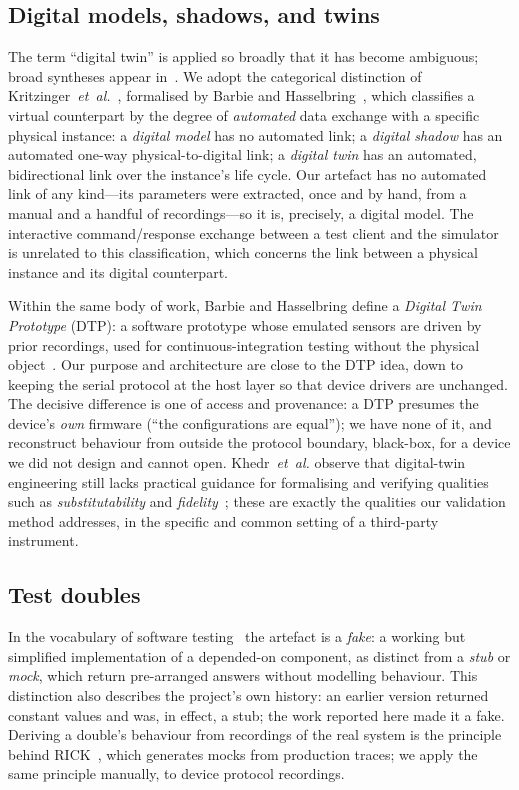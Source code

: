 \documentclass[conference]{IEEEtran}
\begin{document}
\subsection{Digital models, shadows, and twins}
The term ``digital twin'' is applied so broadly that it has become
ambiguous; broad syntheses appear in~\cite{tao2019dt,rasheed2020dt}. We adopt the categorical distinction of
Kritzinger~\emph{et~al.}~\cite{kritzinger2018dt}, formalised by Barbie
and Hasselbring~\cite{barbie2024dtp}, which classifies a virtual
counterpart by the degree of \emph{automated} data exchange with a
specific physical instance: a \emph{digital model} has no automated
link; a \emph{digital shadow} has an automated one-way
physical-to-digital link; a \emph{digital twin} has an automated,
bidirectional link over the instance's life cycle. Our artefact has no
automated link of any kind---its parameters were extracted, once and by
hand, from a manual and a handful of recordings---so it is, precisely, a
digital model. The interactive command/response exchange between a test
client and the simulator is unrelated to this classification, which
concerns the link between a physical instance and its digital
counterpart.

Within the same body of work, Barbie and Hasselbring define a
\emph{Digital Twin Prototype} (DTP): a software prototype whose emulated
sensors are driven by prior recordings, used for continuous-integration
testing without the physical
object~\cite{barbie2024dtp,barbie2023smartfarming}. Our purpose and
architecture are close to the DTP idea, down to keeping the serial
protocol at the host layer so that device drivers are unchanged. The
decisive difference is one of access and provenance: a DTP presumes the
device's \emph{own} firmware (``the configurations are equal''); we have
none of it, and reconstruct behaviour from outside the protocol
boundary, black-box, for a device we did not design and cannot open. Khedr~\emph{et~al.}
observe that digital-twin engineering still lacks practical guidance for
formalising and verifying qualities such as \emph{substitutability} and
\emph{fidelity}~\cite{khedr2026sos}; these are exactly the qualities our
validation method addresses, in the specific and common setting of a
third-party instrument.

\subsection{Test doubles}
In the vocabulary of software testing~\cite{meszaros2007xunit,%
fowler2007mocks} the artefact is a \emph{fake}: a working but simplified
implementation of a depended-on component, as distinct from a
\emph{stub} or \emph{mock}, which return pre-arranged answers without
modelling behaviour. This distinction also describes the project's own
history: an earlier version returned constant values and was, in effect,
a stub; the work reported here made it a fake. Deriving a double's
behaviour from recordings of the real system is the principle behind
RICK~\cite{tiwari2023rick}, which generates mocks from production
traces; we apply the same principle manually, to device protocol
recordings.
\end{document}
